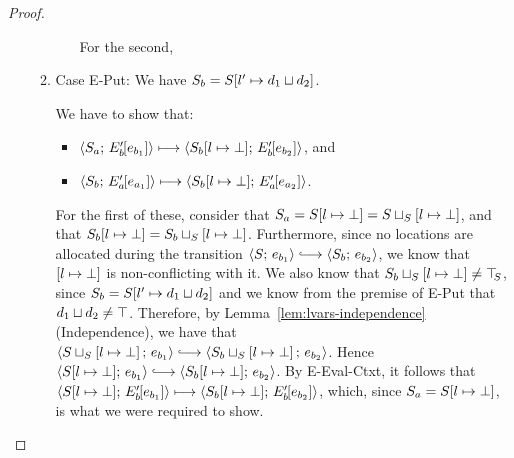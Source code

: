 \begin{proof}
\begin{enumerate}
\begin{enumerate}
\begin{itemize}
          For the second, 


      \end{itemize}

    \item \label{lvars-slc-new-put}Case {\sc E-Put}: We have $S_b =
      S[l' \mapsto d_1 \sqcup d_2]$.

      We have to show that:
      \begin{itemize}
      \item $\langle S_a;\, E'_b\hspace{-1mm}\left[e_{b_1}\right] \rangle \longmapsto
        \langle S_b[l \mapsto \bot];\, E'_b\hspace{-1mm}\left[e_{b_2}\right] \rangle$,
        and
      \item
        $\langle S_b;\, E'_a\hspace{-1mm}\left[e_{a_1}\right] \rangle \longmapsto
        \langle S_b[l \mapsto \bot];\, E'_a\hspace{-1mm}\left[e_{a_2}\right] \rangle$.
      \end{itemize}

      For the first of these, consider that $S_a =
      S[l \mapsto \bot] =
      S \sqcup_{S} \left[ l \mapsto \bot \right]$, and that
      $S_b[l \mapsto \bot] =
      S_b \sqcup_{S} \left[ l \mapsto \bot \right]$.
      Furthermore, since no locations are allocated during the
      transition $\config{S}{e_{b_1}} \parstepsto
      \config{S_b}{e_{b_2}}$, we know that
      $\left[ l \mapsto \bot \right]$ is non-conflicting with it.
      We also know that
      $S_b \sqcup_{S} \left[ l \mapsto \bot \right] \neq \top\hspace{-0.85mm}_{S}$,
      since $S_b = S[l' \mapsto d_1 \sqcup d_2]$ and we know
      from the premise of {\sc E-Put} that $d_1 \sqcup d_2 \neq
      \top$.  Therefore, by Lemma~\ref{lem:lvars-independence}
      (Independence), we have that
      $\config{\lubstore{S}{\store{\storebindingRaw{l}{\bot}}}}{e_{b_1}}
      \parstepsto
      \config{\lubstore{S_b}{\store{\storebindingRaw{l}{\bot}}}}{e_{b_2}}$.
      Hence $\config{\extSRaw{S}{l}{\bot}}{e_{b_1}} \parstepsto
      \config{\extSRaw{S_b}{l}{\bot}}{e_{b_2}}$.  By {\sc
        E-Eval-Ctxt}, it follows that
      $\langle S[l \mapsto \bot];\, E'_b\hspace{-1mm}\left[e_{b_1}\right] \rangle
      \longmapsto
      \langle S_b[l \mapsto \bot];\, E'_b\hspace{-1mm}\left[e_{b_2}\right] \rangle$,
      which, since $S_a = S[l \mapsto \bot]$, is what we were
      required to show.


\end{enumerate}
\end{enumerate}
\end{proof}
